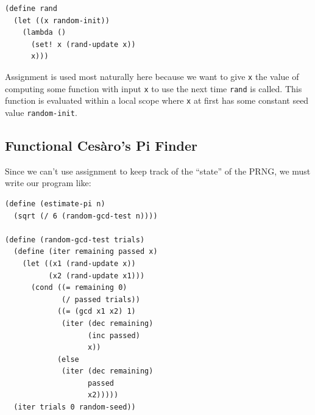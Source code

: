 \documentclass[9pt]{report}
\begin{document}
\begin{verbatim}
(define rand
  (let ((x random-init))
    (lambda ()
      (set! x (rand-update x))
      x)))
\end{verbatim}

Assignment is used most naturally here because we want to give \texttt{x}
the value of computing some function with input \texttt{x} to use the
next time \texttt{rand} is called. This function is evaluated within a
local scope where \texttt{x} at first has some constant seed value
\texttt{random-init}.


\subsection{Functional Cesàro's Pi Finder}
\label{sec:orgad7edda}

Since we can't use assignment to keep track of the ``state'' of the
PRNG, we must write our program like:

\begin{verbatim}
(define (estimate-pi n)
  (sqrt (/ 6 (random-gcd-test n))))

(define (random-gcd-test trials)
  (define (iter remaining passed x)
    (let ((x1 (rand-update x))
          (x2 (rand-update x1)))
      (cond ((= remaining 0)
             (/ passed trials))
            ((= (gcd x1 x2) 1)
             (iter (dec remaining)
                   (inc passed)
                   x))
            (else
             (iter (dec remaining)
                   passed
                   x2)))))
  (iter trials 0 random-seed))
\end{verbatim}
\end{document}
